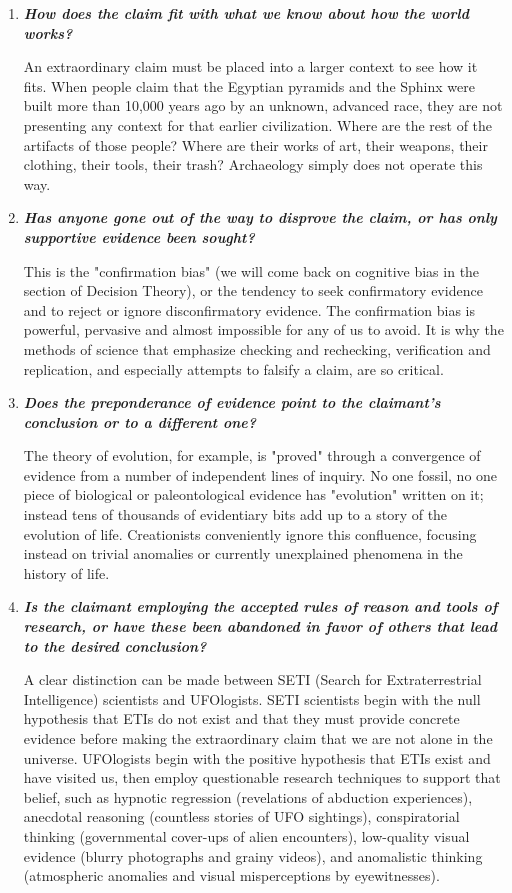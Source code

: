 \begin{enumerate}
		\item \textit{\textbf{How does the claim fit with what we know about how the world works?}}

		An extraordinary claim must be placed into a larger context to see how it fits. When people claim that the Egyptian pyramids and the Sphinx were built more than 10,000 years ago by an unknown, advanced race, they are not presenting any context for that earlier civilization. Where are the rest of the artifacts of those people? Where are their works of art, their weapons, their clothing, their tools, their trash? Archaeology simply does not operate this way.

		\item \textit{\textbf{Has anyone gone out of the way to disprove the claim, or has only supportive evidence been sought?}}

		This is the "confirmation bias" (we will come back on cognitive bias in the section of Decision Theory), or the tendency to seek confirmatory evidence and to reject or ignore disconfirmatory evidence. The confirmation bias is powerful, pervasive and almost impossible for any of us to avoid. It is why the methods of science that emphasize checking and rechecking, verification and replication, and especially attempts to falsify a claim, are so critical. 

		\item \textit{\textbf{Does the preponderance of evidence point to the claimant's conclusion or to a  different one?}}

		The theory of evolution, for example, is "proved" through a convergence of evidence from a number of independent lines of inquiry. No one fossil, no one piece of biological or paleontological evidence has "evolution" written on it; instead tens of thousands of evidentiary bits add up to a story of the evolution of life. Creationists conveniently ignore this confluence, focusing instead on trivial anomalies or currently unexplained phenomena in the history of life.

		\item \textit{\textbf{Is the claimant employing the accepted rules of reason and tools of research, or have these been abandoned in favor of others that lead to the desired conclusion?}} 

		A clear distinction can be made between SETI (Search for Extraterrestrial Intelligence) scientists and UFOlogists. SETI scientists begin with the null hypothesis that ETIs do not exist and that they must provide concrete evidence before making the extraordinary claim that we are not alone in the universe. UFOlogists begin with the positive hypothesis that ETIs exist and have visited us, then employ questionable research techniques to support that belief, such as hypnotic regression (revelations of abduction experiences), anecdotal reasoning (countless stories of UFO sightings), conspiratorial thinking (governmental cover-ups of alien encounters), low-quality visual evidence (blurry photographs and grainy videos), and anomalistic thinking (atmospheric anomalies and visual misperceptions by eyewitnesses).


\end{enumerate}
